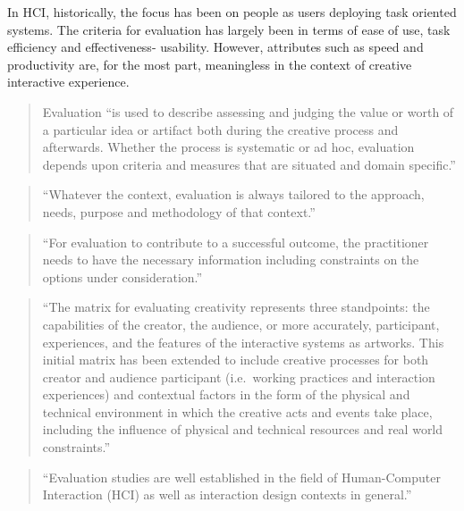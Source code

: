 In HCI, historically, the focus has been on people as users deploying task oriented systems. The criteria for evaluation has largely been in terms of ease of use, task efficiency and effectiveness- usability. However, attributes such as speed and productivity are, for the most part, meaningless in the context of creative interactive experience. \citep[p.23]{Candy2012}

\begin{quote}
  Evaluation ``is used to describe assessing and judging the value or worth of a particular idea or artifact both during the creative process and afterwards. Whether the process is systematic or ad hoc, evaluation depends upon criteria and measures that are situated and domain specific.'' \citep[p.7]{Candy2012}
\end{quote}

\begin{quote}
  ``Whatever the context, evaluation is always tailored to the approach, needs, purpose and methodology of that context.'' \citep[p.7]{Candy2012}
\end{quote}

\begin{quote}
  ``For evaluation to contribute to a successful outcome, the practitioner needs to have the necessary information including constraints on the options under consideration.'' \citep[p.7]{Candy2012}
\end{quote}

\begin{quote}
  ``The matrix for evaluating creativity represents three standpoints: the capabilities of the creator, the audience, or more accurately, participant, experiences, and the features of the interactive systems as artworks. This initial matrix has been extended to include creative processes for both creator and audience participant (i.e.\ working practices and interaction experiences) and contextual factors in the form of the physical and technical environment in which the creative acts and events take place, including the influence of physical and technical resources and real world constraints.'' \citep[p.7-8]{Candy2012}
\end{quote}

\begin{quote}
  ``Evaluation studies are well established in the field of Human-Computer Interaction (HCI) as well as interaction design contexts in general.'' \citep[p.8]{Candy2012}
\end{quote}


